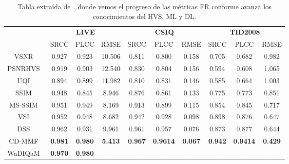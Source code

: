 \begin{table}[htp]
  \tiny
  \centering
  \begin{tabular}{|c|c|c|c|c|c|c|c|c|c|}
    \hline
    \rowcolor[HTML]{FFC702}
    \cellcolor[HTML]{FFC702}&  \multicolumn{3}{c|}{\cellcolor[HTML]{FFC702}\textbf{LIVE}}& \multicolumn{3}{c|}{\cellcolor[HTML]{FFC702}\textbf{CSIQ}} & \multicolumn{3}{c|}{\cellcolor[HTML]{FFC702}\textbf{TID2008}} \\ \cline{2-10}
    \rowcolor[HTML]{FFC702}
    \multirow{-2}{*}{\textbf{Métrica}} & SRCC & PLCC & RMSE & SRCC & PLCC & RMSE & SRCC & PLCC & RMSE \\
    \hline
                   VSNR~\cite{VSNR} & 0.927 & 0.923 & 10.506 & 0.811 & 0.800 & 0.158 & 0.705 & 0.682 & 0.982 \\
                   PSNRHVS~\cite{PSNR-HVS} & 0.919 & 0.903 & 12.540 & 0.830 & 0.804 & 0.156 & 0.594 & 0.608 & 1.065 \\
                   UQI~\cite{UQI} & 0.894 & 0.899 & 11.982 & 0.810 & 0.831 & 0.146 & 0.585 & 0.664 & 1.003 \\
                   SSIM~\cite{SSIM} & 0.948 & 0.845 & 8.946 & 0.876 & 0.861 & 0.133 & 0.775 & 0.773 & 0.851 \\ 
                   MS-SSIM~\cite{MS-SSIM} & 0.951 & 0.949 & 8.169 & 0.913 & 0.899 & 0.115 & 0.854 & 0.845 & 0.717 \\
                   VSI~\cite{VSI} & 0.952 & 0.948 & 8.682 & 0.942 & 0.928 & 0.098 & 0.898 & 0.876 & 0.647 \\
                   DSS~\cite{DSS} & 0.962 & 0.931 & 9.961 & 0.961 & 0.957 & 0.076 & 0.873 & 0.877 & 0.644 \\
                   CD-MMF~\cite{MMF} & \textbf{0.981} & \textbf{0.980} & \textbf{5.413} & \textbf{0.967} & \textbf{0.9614} & \textbf{0.067} & \textbf{0.942} & \textbf{0.9414} & \textbf{0.429} \\
                   WaDIQaM~\cite{DIQaM} & \textbf{0.970} & \textbf{0.980} & - & - & - & - & - & - & - \\
                  \hline 
  \end{tabular}
  \caption[Tablas estado del arte FR-IQA.]{Tabla extraída de~\cite{SurveyOf2D3DMetrics}, 
    donde vemos el progreso de las métricas FR conforme avanza los conocimientos
  del HVS, ML y DL.}
    \label{tab:SOTAFRIQA}
\end{table}

